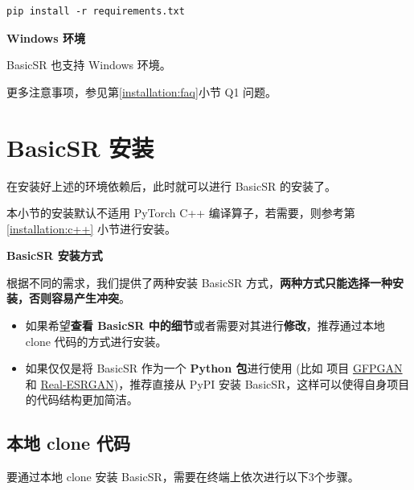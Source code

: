 \documentclass[../main.tex]{subfiles}
\begin{document}
\begin{verbatim}
pip install -r requirements.txt
\end{verbatim}

\begin{note} %
    \textbf{Windows 环境}

    BasicSR 也支持 Windows 环境。

    更多注意事项，参见第\ref{installation:faq}小节 Q1 问题。
\end{note}

\section{BasicSR 安装}
\label{installation:install}
在安装好上述的环境依赖后，此时就可以进行 BasicSR 的安装了。

本小节的安装默认不适用 PyTorch C++ 编译算子，若需要，则参考第 \ref{installation:c++} 小节进行安装。

\begin{hl} %
    \textbf{BasicSR 安装方式}

    根据不同的需求，我们提供了两种安装 BasicSR 方式，{\color{red}\textbf{两种方式只能选择一种安装，否则容易产生冲突}}。

    \begin{itemize}
        \item 如果希望\textbf{查看 BasicSR 中的细节}或者需要对其进行\textbf{修改}，推荐通过本地 clone 代码的方式进行安装。
        \item 如果仅仅是将 BasicSR 作为一个\textbf{ Python 包}进行使用 (比如 项目 \href{https://github.com/TencentARC/GFPGAN}{GFPGAN} 和 \href{https://github.com/xinntao/Real-ESRGAN}{Real-ESRGAN})，推荐直接从 PyPI 安装 BasicSR，这样可以使得自身项目的代码结构更加简洁。
    \end{itemize}
\end{hl}

\subsection{本地 clone 代码}
\label{installation:local-clone}
要通过本地 clone 安装 BasicSR，需要在终端上依次进行以下3个步骤。
\end{document}
